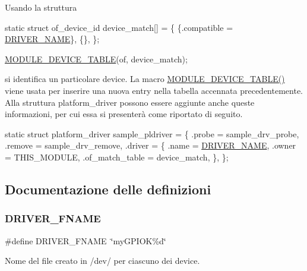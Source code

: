 Usando la struttura


\begin{DoxyCode}
\textcolor{keyword}{static} \textcolor{keyword}{struct }of\_device\_id device\_match[] = \{
        \{.compatible = \hyperlink{group___linux-_driver_ga25634d21648ca7fb7a2aca614bafaaeb}{DRIVER\_NAME}\},
        \{\},
\};

\hyperlink{group___linux-_driver_gaf33e020610cd80a1cfa2ed79b512b841}{MODULE\_DEVICE\_TABLE}(of, device\_match);
\end{DoxyCode}


si identifica un particolare device. La macro \hyperlink{group___linux-_driver_gaf33e020610cd80a1cfa2ed79b512b841}{M\+O\+D\+U\+L\+E\+\_\+\+D\+E\+V\+I\+C\+E\+\_\+\+T\+A\+B\+L\+E()} viene usata per inserire una nuova entry nella tabella accennata precedentemente. Alla struttura platform\+\_\+driver possono essere aggiunte anche queste informazioni, per cui essa si presenterà come riportato di seguito.


\begin{DoxyCode}
\textcolor{keyword}{static} \textcolor{keyword}{struct }platform\_driver sample\_pldriver = \{
    .probe  = sample\_drv\_probe,
    .remove = sample\_drv\_remove,
    .driver = \{
        .name  = \hyperlink{group___linux-_driver_ga25634d21648ca7fb7a2aca614bafaaeb}{DRIVER\_NAME},
        .owner = THIS\_MODULE,
        .of\_match\_table = device\_match,
    \},
\};
\end{DoxyCode}
 

\subsection{Documentazione delle definizioni}
\mbox{\label{group___linux-_driver_ga4fa7cb23649a4090e79e2610b7ba0a93}} 
\subsubsection{\texorpdfstring{D\+R\+I\+V\+E\+R\+\_\+\+F\+N\+A\+ME}{DRIVER\_FNAME}}
{\footnotesize\ttfamily \#define D\+R\+I\+V\+E\+R\+\_\+\+F\+N\+A\+ME~\char`\"{}my\+G\+P\+I\+OK\%d\char`\"{}}



Nome del file creato in /dev/ per ciascuno dei device. 

